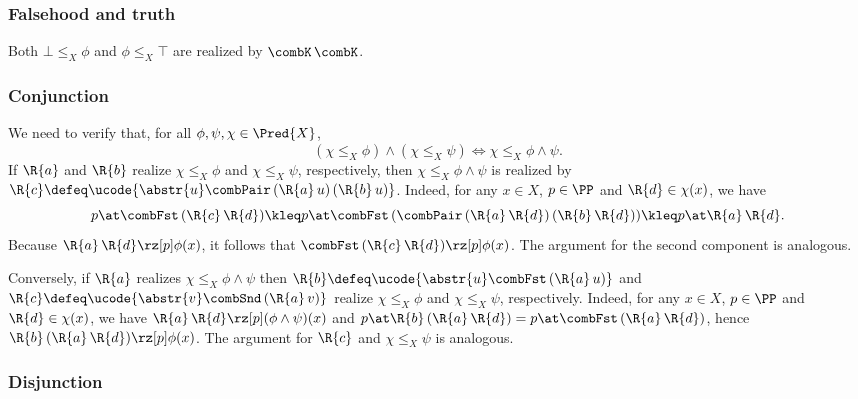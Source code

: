 \subsubsection{Falsehood and truth}
\label{sec:falsehood-truth}

Both $\bot \leq_X \phi$ and $\phi \leq_X \top$ are realized by $\combK \, \combK$.

\subsubsection{Conjunction}
\label{sec:conjunction}

We need to verify that, for all $\phi, \psi, \chi \in \Pred{X}$,
%
\begin{equation*}
  (\chi \leq_X \phi) \land (\chi \leq_X \psi) \iff \chi \leq_X \phi \land \psi.
\end{equation*}
%
If $\R{a}$ and $\R{b}$ realize $\chi \leq_X \phi$ and $\chi \leq_X \psi$, respectively, then $\chi \leq_X \phi \land \psi$ is realized by $\R{c} \defeq \ucode{\abstr{u} \combPair \, (\R{a} \, u) \, (\R{b} \, u)}$. Indeed, for any $x \in X$, $p \in \PP$ and $\R{d} \in \chi(x)$, we have
%
\begin{equation*}
  p \at \combFst \, (\R{c} \, \R{d})
  \kleq
  p \at \combFst \, (\combPair \, (\R{a} \, \R{d}) \, (\R{b} \, \R{d}))
  \kleq
  p \at \R{a} \, \R{d}.
\end{equation*}
%
Because $\R{a} \, \R{d} \rz[p] \phi(x)$, it follows that $\combFst \, (\R{c} \, \R{d}) \rz[p] \phi(x)$.
The argument for the second component is analogous.

Conversely, if $\R{a}$ realizes $\chi \leq_X \phi \land \psi$ then $\R{b} \defeq \ucode{\abstr{u} \combFst \, (\R{a} \, u)}$ and $\R{c} \defeq \ucode{\abstr{v} \combSnd \, (\R{a} \, v)}$ realize $\chi \leq_X \phi$ and $\chi \leq_X \psi$, respectively. Indeed, for any $x \in X$, $p \in \PP$ and $\R{d} \in \chi(x)$, we have $\R{a} \, \R{d} \rz[p] (\phi \land \psi)(x)$ and $p \at \R{b} \, (\R{a} \, \R{d}) = p \at \combFst \, (\R{a} \, \R{d})$, hence $\R{b} \, (\R{a} \, \R{d}) \rz[p] \phi(x)$.
The argument for $\R{c}$ and $\chi \leq_X \psi$ is analogous.

\subsubsection{Disjunction}
\label{sec:disjunction}

